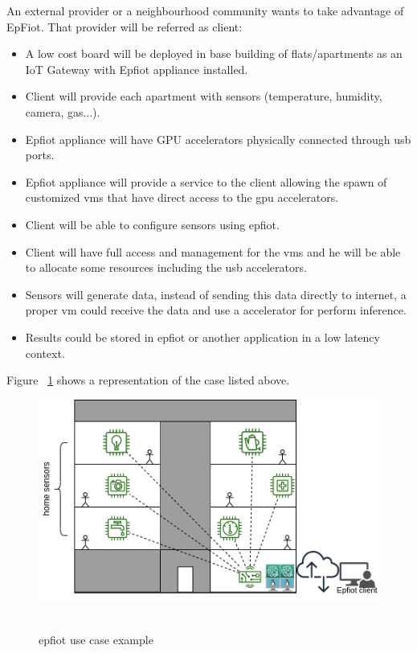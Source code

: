 An external provider or a neighbourhood community wants to take advantage of EpFiot. That provider will be referred as client:
\begin{itemize}
  \item A low cost board will be deployed in base building of flats/apartments as an IoT Gateway with Epfiot appliance installed.
  \item Client will provide each apartment with sensors (temperature, humidity, camera, gas...).
  \item Epfiot appliance will have GPU accelerators physically connected through usb ports.
  \item Epfiot appliance will provide a service to the client allowing the spawn of customized vms that have direct access to the gpu accelerators.
  \item Client will be able to configure sensors using epfiot.
  \item Client will have full access and management for the vms and he will be able to allocate some resources including the usb accelerators.
  \item Sensors will generate data, instead of sending this data directly to internet, a proper vm could receive the data and use a accelerator for perform inference.
  \item Results could be stored in epfiot or another application in a low latency context.
\end{itemize}

Figure ~\ref{figure1.2} shows a representation of the case listed above.

\begin{figure}[h]%
    \includegraphics[width=6.5in]{figures/use_case.png}
~\caption{epfiot use case example}
\label{figure1.2}
\end{figure}

